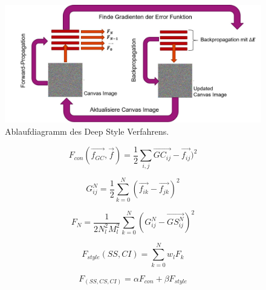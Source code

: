 \documentclass[times, 11pt,twocolumn]{article}
\begin{document}
\label{sec:DeepStyle}
\begin{figure}
	\flushleft
	\includegraphics[width=\columnwidth]{Bilder/DeepStyle.jpg}
	\caption{Ablaufdiagramm des Deep Style Verfahrens.}
	\label{fig:DeepStyle}
\end{figure}
\footnotesize
\begin{equation}
F_{con}(\vec{f_{GC}}, \vec{f})= \frac{1}{2}\sum_{i,j}\vec{GC_{ij}}- \vec{f_{ij}})^2
\label{eq:DeepStyleContError}
\end{equation}
\small

\footnotesize
\begin{equation}
G_{ij}^N= \frac{1}{2}\sum_{k=0}^N (\vec{f_{ik}}- \vec{f_{jk}})^2
\label{eq:DeepStyleCorr}
\end{equation}
\small

\footnotesize
\begin{equation}
F_N= \frac{1}{2N_l^2M_l^2}\sum_{k=0}^N (G_{ij}^N- \vec{GS_{ij}^N})^2
\label{eq:DeepStyleCorrErr}
\end{equation}
\small

\footnotesize
\begin{equation}
F_{style}(SS,CI)= \sum_{k=0}^N w_l F_k
\label{eq:DeepStyleCorrErr}
\end{equation}
\small

\footnotesize
\begin{equation}
F_(SS,CS,CI)= \alpha F_{con}+\beta F_{style}
\label{eq:DeepStyleCorrErr}
\end{equation}
\small
\end{document}
